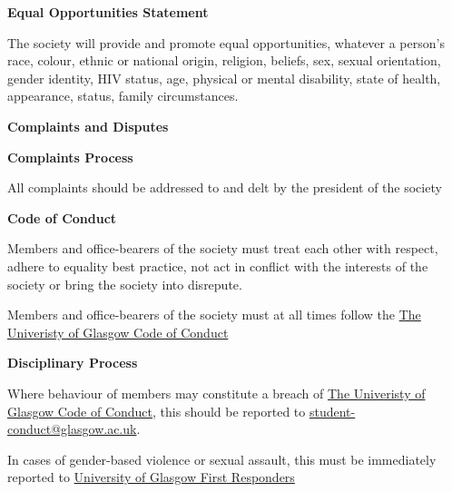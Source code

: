 \documentclass[11pt]{article}
\newcommand{\headItem}[1]{\global\isHeadtrue\item {\bfseries #1}}
\newif\ifisHead
\begin{document}
\begin{level}
\begin{level}
		\end{level}
		
		\headItem {Equal Opportunities Statement}
		
		The society will provide and promote equal opportunities, whatever a person’s race, colour, ethnic or national origin, religion, beliefs, sex, sexual orientation, gender identity, HIV status, age, physical or mental disability, state of health, appearance, status, family circumstances.
		
		\headItem {Complaints and Disputes}
		\begin{level}
			
			\headItem {Complaints Process}
			\begin{level}
				\item All complaints should be addressed to and delt by the president of the society
				
			\end{level}
		
			\headItem {Code of Conduct}
			\begin{level}
				\item Members and office-bearers of the society must treat each other with respect, adhere to equality best practice, not act in conflict with the interests of the society or bring the society into disrepute.
				\item Members and office-bearers of the society must at all times follow the \href{https://www.gla.ac.uk/myglasgow/senateoffice/policies/uniregs/regulations2020-21/feesandgeneral/studentsupportandconductmatters/reg33/}{The Univeristy of Glasgow Code of Conduct}
				
			\end{level}
		
			\headItem {Disciplinary Process}
			\begin{level}
				\item Where behaviour of members may constitute a breach of \href{https://www.gla.ac.uk/myglasgow/senateoffice/policies/uniregs/regulations2020-21/feesandgeneral/studentsupportandconductmatters/reg33/}{The Univeristy of Glasgow Code of Conduct}, this should be reported to \href{mailto:student-conduct@glasgow.ac.uk}{student-conduct@glasgow.ac.uk}.
				\item In cases of gender-based violence or sexual assault, this must be immediately reported to \href{https://www.gla.ac.uk/myglasgow/students/safetyhealth/firstresponders/#howtocontactafirstresponder}{University of Glasgow First Responders}
				

\end{level}
\end{level}
\end{level}
\end{document}
